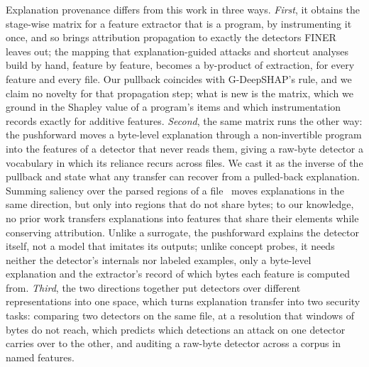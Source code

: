 Explanation provenance differs from this work in three ways. \emph{First}, it obtains the stage-wise matrix for a
feature extractor that is a program, by instrumenting it once, and so brings
attribution propagation to exactly the detectors FINER leaves out; the mapping that explanation-guided attacks and
shortcut analyses build by hand, feature by feature, becomes a by-product of extraction, for every feature and every
file. Our pullback coincides with G-DeepSHAP's rule, and we claim no novelty for that propagation step; what is new is
the matrix, which we ground in the Shapley value of a program's items and which instrumentation records exactly for
additive features. \emph{Second}, the same matrix runs the other way: the pushforward moves a byte-level
explanation through a non-invertible program into the features of a detector that never reads them, giving a raw-byte
detector a vocabulary in which its reliance recurs across files. We cast it as the inverse of the pullback and state
what any transfer can recover from a pulled-back explanation. Summing saliency over the parsed regions of a
file~\cite{coull2019activation, bose2020explaining, aryal2024explainability} moves explanations in the same direction,
but only into regions that do not share bytes; to our knowledge, no prior work transfers explanations into features
that share their elements while conserving attribution. Unlike a surrogate, the pushforward explains the detector itself, not a model that
imitates its outputs; unlike concept probes, it needs neither the detector's internals nor labeled examples, only a
byte-level explanation and the extractor's record of which bytes each feature is computed from. \emph{Third}, the two directions together put detectors over different representations
into one space, which turns explanation transfer into two security tasks: comparing two detectors on the same file, at a
resolution that windows of bytes do not reach, which predicts which detections an attack on one detector carries over to
the other, and auditing a raw-byte detector across a corpus in named features.
